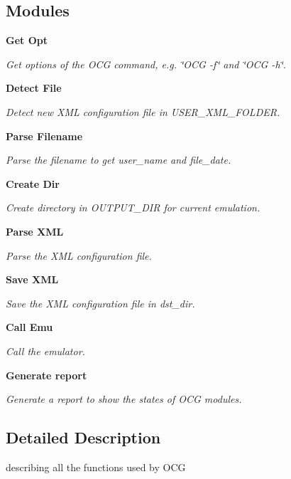 \subsection*{Modules}
\begin{CompactItemize}
\item 
{\bf Get Opt}
\begin{CompactList}\small\item\em Get options of the OCG command, e.g. \char`\"{}OCG -f\char`\"{} and \char`\"{}OCG -h\char`\"{}. \item\end{CompactList}

\item 
{\bf Detect File}
\begin{CompactList}\small\item\em Detect new XML configuration file in USER\_\-XML\_\-FOLDER. \item\end{CompactList}

\item 
{\bf Parse Filename}
\begin{CompactList}\small\item\em Parse the filename to get user\_\-name and file\_\-date. \item\end{CompactList}

\item 
{\bf Create Dir}
\begin{CompactList}\small\item\em Create directory in OUTPUT\_\-DIR for current emulation. \item\end{CompactList}

\item 
{\bf Parse XML}
\begin{CompactList}\small\item\em Parse the XML configuration file. \item\end{CompactList}

\item 
{\bf Save XML}
\begin{CompactList}\small\item\em Save the XML configuration file in dst\_\-dir. \item\end{CompactList}

\item 
{\bf Call Emu}
\begin{CompactList}\small\item\em Call the emulator. \item\end{CompactList}

\item 
{\bf Generate report}
\begin{CompactList}\small\item\em Generate a report to show the states of OCG modules. \item\end{CompactList}

\end{CompactItemize}


\subsection{Detailed Description}
describing all the functions used by OCG 